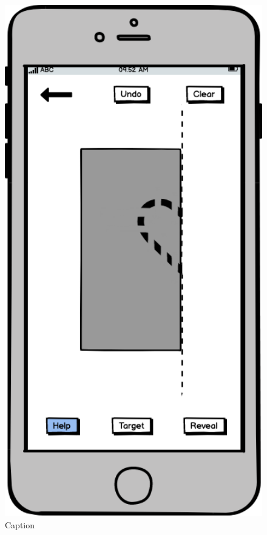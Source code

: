\documentclass[11pt]{article}
\begin{document}
            \begin{figure}
                \begin{minipage}[c]{0.35\textwidth}
                \includegraphics[width=1\textwidth]{Images/Prototype/prototypeMatchPatternCreateHelp.png}
                \end{minipage}\hfill
                \begin{minipage}[c]{0.65\textwidth}
                \caption{Caption}
                \label{fig:matchPatternCreateHelp}
                \end{minipage}
            \end{figure}
            
\end{document}
